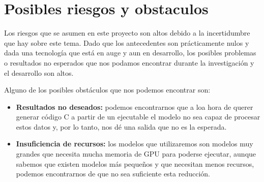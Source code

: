 \section{Posibles riesgos y obstaculos}
\label{sec:riesgos}


Los riesgos que se asumen en este proyecto son altos debido a la incertidumbre que hay
sobre este tema. Dado que los antecedentes son prácticamente nulos y dada una tecnología
que está en auge y aun en desarrollo, los posibles problemas o resultados no esperados
que nos podamos encontrar durante la investigación y el desarrollo son altos.

Alguno de los posibles obstáculos que nos podemos encontrar son:

\begin{itemize}
    \item \textbf{Resultados no deseados:} podemos encontrarnos que a loa hora de querer
        generar código C a partir de un ejecutable el modelo no sea capaz de procesar estos datos
        y, por lo tanto, nos dé una salida que no es la esperada.
    \item \textbf{Insuficiencia de recursos:} los modelos que utilizaremos son modelos
        muy grandes que necesita mucha memoria de GPU para poderse ejecutar, aunque sabemos que
        existen modelos más pequeños y que necesitan menos recursos, podemos encontrarnos de
        que no sea suficiente esta reducción.
\end{itemize}
